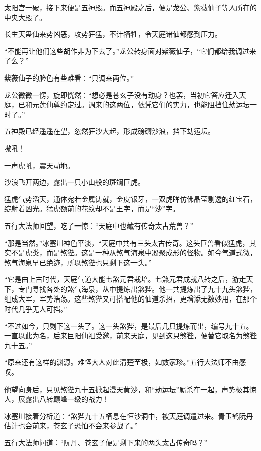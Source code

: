 
\begin{this_body}

太阳宫一破，接下来便是五神殿。而五神殿之后，便是龙公、紫薇仙子等人所在的中央大殿了。

长生天蛊仙来势凶恶，攻势狂猛，不计牺牲，令天庭诸仙都感到压力。

“不能再让他们这些胡作非为下去了。”龙公转身面对紫薇仙子，“它们都给我调过来了么？”

紫薇仙子的脸色有些难看：“只调来两位。”

龙公微微一愣，旋即恍然：“想必是苍玄子没有动身？也罢，当初它答应迁入天庭，已和元莲仙尊约定过。调来的这两位，依凭它们的实力，也能阻挡住劫运坛一时了。”

五神殿已经遥遥在望，忽然狂沙大起，形成磅礴沙浪，挡下劫运坛。

嗷吼！

一声虎吼，震天动地。

沙浪飞开两边，露出一只小山般的斑斓巨虎。

猛虎气势滔天，通体宛若金属铸就，金皮银牙，一双虎眸仿佛晶莹剔透的红宝石，绽射着凶光。猛虎额前的花纹却不是王字，而是“沙”字。

五行大法师回望，吃了一惊：“天庭中也藏有传奇太古荒兽？”

“那是当然。”冰塞川神色平淡，“天庭中共有三头太古传奇。这头巨兽看似猛虎，其实不是虎类，而是煞狴。这是一种从煞气海泉中凝聚成形的怪物。如今气道式微，煞气海泉早已绝迹，所以煞狴也只剩下这一头。”

“它是由上古时代，天庭气道大能七煞元君栽培。七煞元君成就八转之后，游走天下，专门寻找各处的煞气海泉，从中提炼出煞狴。他一共提炼出了九十九头煞狴，组成大军，军势浩荡。这些煞狴又可搭配他的仙道杀招，更增添无数妙用，在那个时代几乎无人可挡。”

“不过如今，只剩下这一头了。这一头煞狴，是最后几只提炼而出，编号九十五。一直以此为名，后来巨阳仙祖受邀，前来天庭，见到这只煞狴，便替它取名为煞狴九十五。”

“原来还有这样的渊源。难怪大人对此清楚至极，如数家珍。”五行大法师不由感叹。

他望向身后，只见煞狴九十五掀起漫天黄沙，和“劫运坛”厮杀在一起，声势极其惊人，展露出八转巅峰一级的战力！

冰塞川接着分析道：“煞狴九十五栖息在恒沙洞中，被天庭调遣过来。青玉鹤阮丹估计也会前来，苍玄子恐怕不会来参战了。”

五行大法师问道：“阮丹、苍玄子便是剩下来的两头太古传奇吗？”


\end{this_body}
